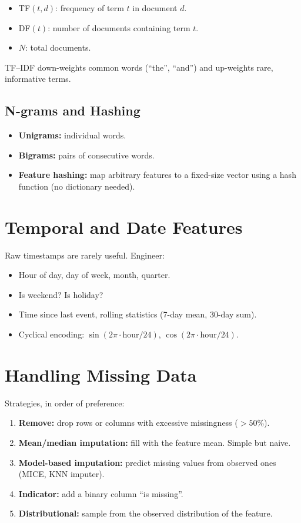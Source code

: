 \begin{itemize}
	\item TF$(t, d)$: frequency of term $t$ in document $d$.
	\item DF$(t)$: number of documents containing term $t$.
	\item $N$: total documents.
\end{itemize}

TF--IDF down-weights common words (``the'', ``and'') and up-weights rare, informative terms.

\subsection{N-grams and Hashing}

\begin{itemize}
	\item \textbf{Unigrams:} individual words.
	\item \textbf{Bigrams:} pairs of consecutive words.
	\item \textbf{Feature hashing:} map arbitrary features to a fixed-size vector using a hash function (no dictionary needed).
\end{itemize}

\section{Temporal and Date Features}

Raw timestamps are rarely useful. Engineer:

\begin{itemize}
	\item Hour of day, day of week, month, quarter.
	\item Is weekend? Is holiday?
	\item Time since last event, rolling statistics (7-day mean, 30-day sum).
	\item Cyclical encoding: $\sin(2\pi \cdot \text{hour} / 24)$, $\cos(2\pi \cdot \text{hour} / 24)$.
\end{itemize}

\section{Handling Missing Data}

Strategies, in order of preference:

\begin{enumerate}
	\item \textbf{Remove:} drop rows or columns with excessive missingness ($> 50\%$).
	\item \textbf{Mean/median imputation:} fill with the feature mean. Simple but naive.
	\item \textbf{Model-based imputation:} predict missing values from observed ones (MICE, KNN imputer).
	\item \textbf{Indicator:} add a binary column ``is missing''.
	\item \textbf{Distributional:} sample from the observed distribution of the feature.
\end{enumerate}

